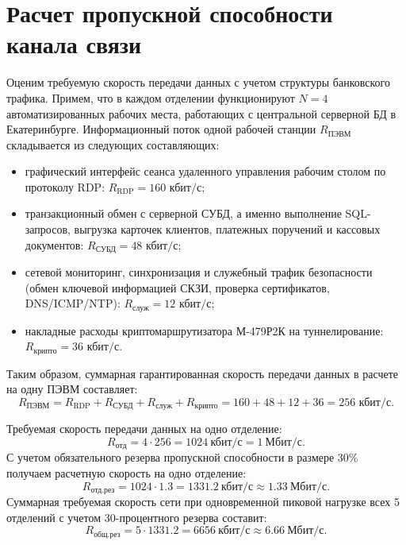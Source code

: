 \newpage
\chapter{Расчет пропускной способности канала связи}

Оценим требуемую скорость передачи данных с учетом структуры банковского трафика.
Примем, что в каждом отделении функционируют $N = 4$ автоматизированных рабочих места, работающих с центральной серверной БД в Екатеринбурге.
Информационный поток одной рабочей станции $R_{\text{ПЭВМ}}$ складывается из следующих составляющих:
\begin{itemize}
    \item[--] графический интерфейс сеанса удаленного управления рабочим столом по протоколу RDP: $R_{\text{RDP}} = 160\text{ кбит/с}$;
    \item[--] транзакционный обмен с серверной СУБД, а именно выполнение SQL-запросов, выгрузка карточек клиентов, платежных поручений и кассовых документов: $R_{\text{СУБД}} = 48\text{ кбит/с}$;
    \item[--] сетевой мониторинг, синхронизация и служебный трафик безопасности (обмен ключевой информацией СКЗИ, проверка сертификатов, DNS/ICMP/NTP): $R_{\text{служ}} = 12\text{ кбит/с}$;
    \item[--] накладные расходы криптомаршрутизатора М-479Р2К на туннелирование: $R_{\text{крипто}} = 36\text{ кбит/с}$.
\end{itemize}

Таким образом, суммарная гарантированная скорость передачи данных в расчете на одну ПЭВМ составляет:
\begin{equation*}
    R_{\text{ПЭВМ}} = R_{\text{RDP}} + R_{\text{СУБД}} + R_{\text{служ}} + R_{\text{крипто}} = 160 + 48 + 12 + 36 = 256\text{ кбит/с}.
\end{equation*}

Требуемая скорость передачи данных на одно отделение:
\begin{equation*}
    R_{\text{отд}} = 4 \cdot 256 = 1024~\text{кбит/с} = 1~\text{Мбит/с}.
\end{equation*}
С учетом обязательного резерва пропускной способности в размере 30\% получаем расчетную скорость на одно отделение:
\begin{equation*}
    R_{\text{отд.рез}} = 1024 \cdot 1.3 = 1331.2~\text{кбит/с} \approx 1.33~\text{Мбит/с}.
\end{equation*}
Суммарная требуемая скорость сети при одновременной пиковой нагрузке всех 5 отделений с учетом 30-процентного резерва составит:
\begin{equation*}
    R_{\text{общ.рез}} = 5 \cdot 1331.2 = 6656~\text{кбит/с} \approx 6.66~\text{Мбит/с}.
\end{equation*}

